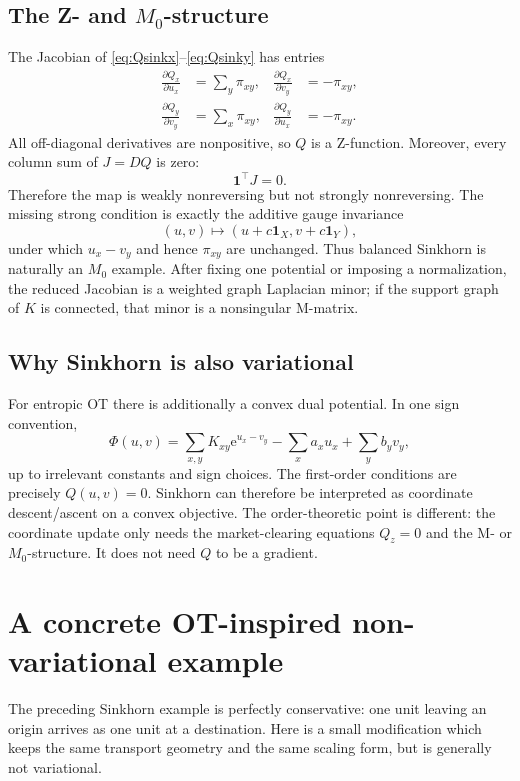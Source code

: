 \documentclass[11pt]{article}
\newcommand{\one}{\mathbf{1}}
\newcommand{\e}{\mathrm{e}}
\theoremstyle{definition}
\theoremstyle{plain}
\begin{document}
\subsection*{The Z- and $M_0$-structure}
The Jacobian of \eqref{eq:Qsinkx}--\eqref{eq:Qsinky} has entries
\begin{align*}
        \frac{\partial Q_x}{\partial u_x}&=\sum_y\pi_{xy},
        &\frac{\partial Q_x}{\partial v_y}&=-\pi_{xy},\\
        \frac{\partial Q_y}{\partial v_y}&=\sum_x\pi_{xy},
        &\frac{\partial Q_y}{\partial u_x}&=-\pi_{xy}.
\end{align*}
All off-diagonal derivatives are nonpositive, so $Q$ is a Z-function. Moreover, every column sum of $J=DQ$ is zero:
\[
        \one^\top J=0.
\]
Therefore the map is weakly nonreversing but not strongly nonreversing. The missing strong condition is exactly the additive gauge invariance
\[
        (u,v)\longmapsto (u+c\one_X,v+c\one_Y),
\]
under which $u_x-v_y$ and hence $\pi_{xy}$ are unchanged. Thus balanced Sinkhorn is naturally an $M_0$ example. After fixing one potential or imposing a normalization, the reduced Jacobian is a weighted graph Laplacian minor; if the support graph of $K$ is connected, that minor is a nonsingular M-matrix.

\subsection*{Why Sinkhorn is also variational}
For entropic OT there is additionally a convex dual potential. In one sign convention,
\[
        \Phi(u,v)
        =\sum_{x,y}K_{xy}\e^{u_x-v_y}
          -\sum_xa_xu_x+\sum_yb_yv_y,
\]
up to irrelevant constants and sign choices. The first-order conditions are precisely $Q(u,v)=0$. Sinkhorn can therefore be interpreted as coordinate descent/ascent on a convex objective. The order-theoretic point is different: the coordinate update only needs the market-clearing equations $Q_z=0$ and the M- or $M_0$-structure. It does not need $Q$ to be a gradient.


\section{A concrete OT-inspired non-variational example}\label{sec:lossy}

The preceding Sinkhorn example is perfectly conservative: one unit leaving an origin arrives as one unit at a destination. Here is a small modification which keeps the same transport geometry and the same scaling form, but is generally not variational.
\end{document}
